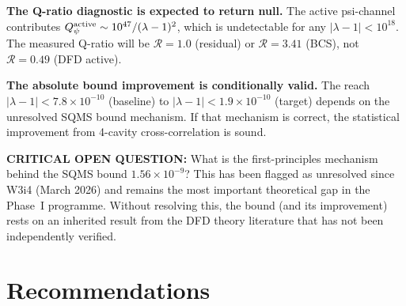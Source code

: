 \documentclass[11pt]{article}
\newcommand{\lam}{\lambda}
\newcommand{\lbone}{|\lambda - 1|}
\newcommand{\Qpsi}{Q_\psi}
\newcommand{\ee}[1]{\times 10^{#1}}
\theoremstyle{definition}
\theoremstyle{remark}
\begin{document}
\begin{tcolorbox}[colback=yellow!10!white, colframe=red!60!black,
  title=\textbf{CORRECTED PHASE~I ASSESSMENT}]

\textbf{The Q-ratio diagnostic is expected to return null.}
The active psi-channel contributes $\Qpsi^{\rm active} \sim
10^{47}/(\lam-1)^2$, which is undetectable for any $\lbone < 10^{18}$.
The measured Q-ratio will be $\mathcal{R} = 1.0$ (residual) or
$\mathcal{R} = 3.41$ (BCS), not $\mathcal{R} = 0.49$ (DFD active).

\textbf{The absolute bound improvement is conditionally valid.}
The reach $\lbone < 7.8\ee{-10}$ (baseline) to $\lbone < 1.9\ee{-10}$
(target) depends on the unresolved SQMS bound mechanism. If that
mechanism is correct, the statistical improvement from 4-cavity
cross-correlation is sound.

\textbf{CRITICAL OPEN QUESTION:}
What is the first-principles mechanism behind the SQMS bound
$1.56\ee{-9}$? This has been flagged as unresolved since W3i4
(March 2026) and remains the most important theoretical gap in the
Phase~I programme. Without resolving this, the bound (and its
improvement) rests on an inherited result from the DFD theory
literature that has not been independently verified.

\end{tcolorbox}


\section{Recommendations}
\label{sec:recommendations}
\end{document}
